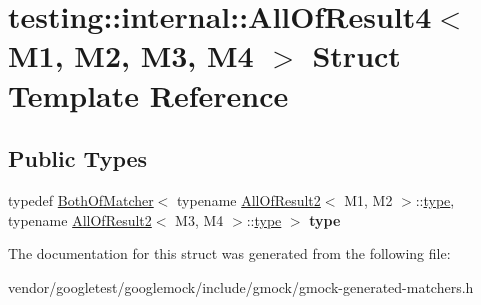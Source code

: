 \hypertarget{structtesting_1_1internal_1_1_all_of_result4}{}\section{testing\+:\+:internal\+:\+:All\+Of\+Result4$<$ M1, M2, M3, M4 $>$ Struct Template Reference}
\label{structtesting_1_1internal_1_1_all_of_result4}
\subsection*{Public Types}
\begin{DoxyCompactItemize}
\item 
\mbox{\label{structtesting_1_1internal_1_1_all_of_result4_ab277e20178bac632d4e5a39a1a407bbf}} 
typedef \hyperlink{classtesting_1_1internal_1_1_both_of_matcher}{Both\+Of\+Matcher}$<$ typename \hyperlink{structtesting_1_1internal_1_1_all_of_result2}{All\+Of\+Result2}$<$ M1, M2 $>$\+::\hyperlink{classtesting_1_1internal_1_1_both_of_matcher}{type}, typename \hyperlink{structtesting_1_1internal_1_1_all_of_result2}{All\+Of\+Result2}$<$ M3, M4 $>$\+::\hyperlink{classtesting_1_1internal_1_1_both_of_matcher}{type} $>$ {\bfseries type}
\end{DoxyCompactItemize}


The documentation for this struct was generated from the following file\+:\begin{DoxyCompactItemize}
\item 
vendor/googletest/googlemock/include/gmock/gmock-\/generated-\/matchers.\+h\end{DoxyCompactItemize}
